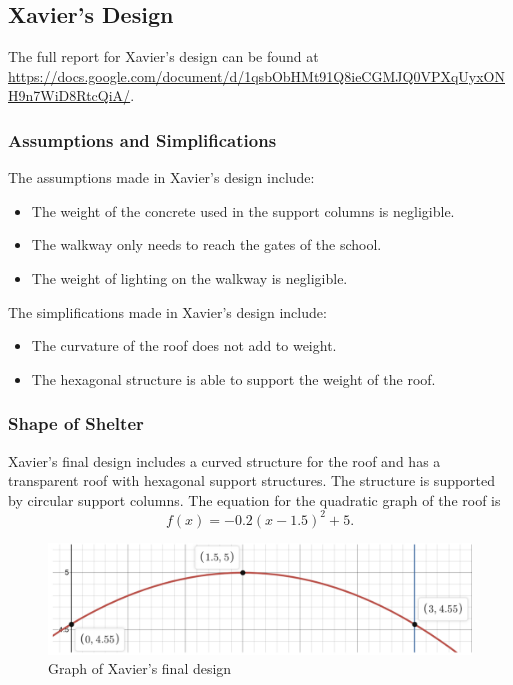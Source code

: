 \documentclass[a4paper,titlepage]{article}
\begin{document}
\pagebreak

\subsection{Xavier's Design}\label{sec:Other Feasible Models:Xavier's Design}

The full report for Xavier's design can be found at \url{https://docs.google.com/document/d/1qsbObHMt91Q8ieCGMJQ0VPXqUyxONH9n7WiD8RtcQiA/}.

\subsubsection{Assumptions and Simplifications}

The assumptions made in Xavier's design include:

\begin{itemize}
    \item The weight of the concrete used in the support columns is negligible.
    \item The walkway only needs to reach the gates of the school.
    \item The weight of lighting on the walkway is negligible.
\end{itemize}

The simplifications made in Xavier's design include:

\begin{itemize}
    \item The curvature of the roof does not add to weight.
    \item The hexagonal structure is able to support the weight of the roof.
\end{itemize}

\subsubsection{Shape of Shelter}

Xavier's final design includes a curved structure for the roof and has a transparent roof with hexagonal support structures. The structure is supported by circular support columns. The equation for the quadratic graph of the roof is \begin{equation}f(x)=-0.2(x-1.5)^2+5.\end{equation} 

\begin{figure}[htbp]
    \centering
    \includegraphics[width=\textwidth]{xavierDesign2.png}
    \caption{Graph of Xavier's final design}
    \label{fig:xavierDesign2}
\end{figure}
\end{document}
